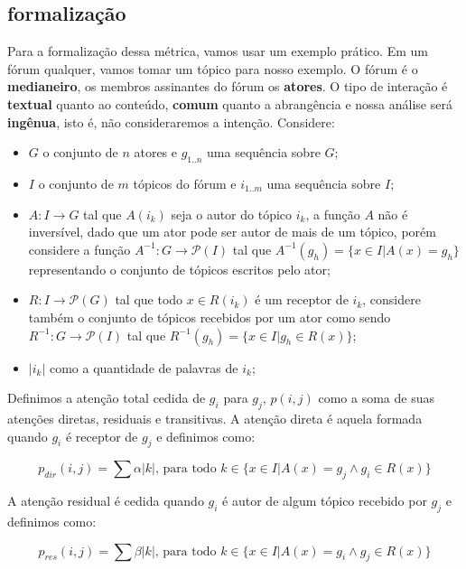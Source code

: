 \documentclass{article}
\begin{document}
\subsection{formalização}
\label{sec:formalizacao}
Para a formalização dessa métrica, vamos usar um exemplo prático. Em um fórum
qualquer, vamos tomar um tópico para nosso exemplo. O fórum é o
\textbf{medianeiro}, os membros assinantes do fórum os \textbf{atores}. O tipo
de interação é \textbf{textual} quanto ao conteúdo, \textbf{comum} quanto a
abrangência e nossa análise será \textbf{ingênua}, isto é, não consideraremos a
intenção. Considere:
\begin{itemize}
  \item $G$ o conjunto de $n$ atores e $g_{1..n}$ uma sequência sobre $G$;
  \item $I$ o conjunto de $m$ tópicos do fórum e $i_{1..m}$ uma sequência sobre
  $I$;
  \item $A:I\to G$ tal que $A(i_k)$ seja o autor do tópico $i_k$, a função $A$
  não é inversível, dado que um ator pode ser autor de mais de um tópico, porém
  considere a função $A^{-1}:G\to \mathcal{P}(I)$ tal que $A^{-1}(g_h) = \{x \in
  I|A(x) = g_h\}$ representando o conjunto de tópicos escritos pelo ator;
  \item $R:I\to \mathcal{P}(G)$ tal que todo $x \in R(i_k)$ é um receptor de
  $i_k$, considere também o conjunto de tópicos recebidos por um ator como sendo
  $R^{-1}:G\to \mathcal{P}(I)$ tal que $R^{-1}(g_h) = \{x \in I|g_h\in R(x)\}$;
  \item $|i_k|$ como a quantidade de palavras de $i_k$; 
\end{itemize}

Definimos a atenção total cedida de $g_i$ para $g_j$, $p(i,j)$ como a soma de
suas atenções diretas, residuais e transitivas. A atenção direta é aquela
formada quando $g_i$ é receptor de $g_j$ e definimos como:

\begin{equation}
\label{def:atedireta}
p_{dir}(i,j) = \sum \alpha |k|\text{, para todo $k \in \{x \in I| A(x)=g_j
\wedge g_i \in R(x)\}$}
\end{equation}

A atenção residual é cedida quando $g_i$ é autor de algum tópico recebido por
$g_j$ e definimos como:

\begin{equation}
\label{def:ateresidual}
p_{res}(i,j) = \sum \beta |k|\text{, para todo $k \in \{x \in I| A(x)=g_i
\wedge g_j \in R(x)\}$}
\end{equation}
\end{document}
